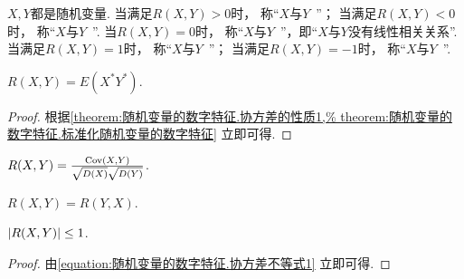 \begin{definition}
\(X,Y\)都是随机变量.
当满足\(R(X,Y) > 0\)时，
称“\(X\)与\(Y\)~”；
当满足\(R(X,Y) < 0\)时，
称“\(X\)与\(Y\)~”.
当\(R(X,Y) = 0\)时，
称“\(X\)与\(Y\)~”，即“\(X\)与\(Y\)没有线性相关关系”.
当满足\(R(X,Y) = 1\)时，
称“\(X\)与\(Y\)~”；
当满足\(R(X,Y) = -1\)时，
称“\(X\)与\(Y\)~”.
\end{definition}

\begin{theorem}\label{theorem:随机变量的数字特征.相关系数的性质1}
\(R(X,Y) = E(X^* Y^*)\).
\begin{proof}
根据\cref{theorem:随机变量的数字特征.协方差的性质1,%
theorem:随机变量的数字特征.标准化随机变量的数字特征} 立即可得.
\end{proof}
\end{theorem}

\begin{theorem}\label{theorem:随机变量的数字特征.相关系数的性质2}
\(R(X,Y) = \frac{\operatorname{Cov}(X,Y)}{\sqrt{D(X)} \sqrt{D(Y)}}\).
\end{theorem}

\begin{property}
\(R(X,Y)=R(Y,X)\).
\end{property}

\begin{property}
\(\abs{R(X,Y)} \leq 1\).
\begin{proof}
由\cref{equation:随机变量的数字特征.协方差不等式1} 立即可得.
\end{proof}
\end{property}

